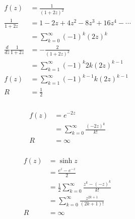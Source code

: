 \documentclass{article}
\begin{document}
\setcounter{subsubsection}{2}
\subsubsection{}

\begin{align*}
  f(z)                            & = \frac{1}{(1 + 2 z)^2}                            \\
  \frac{1}{1 + 2 z}               & = 1 - 2 z + 4 z^2 - 8 z^3 + 16 z^4 - \cdots        \\
                                  & = \sum_{k = 0}^\infty (-1)^k (2 z)^k               \\
  \frac{d}{d z} \frac{1}{1 + 2 z} & = -\frac{2}{(1 + 2 z)^2}                           \\
                                  & = \sum_{k = 1}^\infty (-1)^k 2 k (2 z)^{k - 1}     \\
  f(z)                            & = \sum_{k = 1}^\infty (-1)^{k - 1} k (2 z)^{k - 1} \\
  R                               & = \frac{1}{2}
\end{align*}

\setcounter{subsubsection}{4}
\subsubsection{}

\begin{align*}
  f(z) & = e^{-2 z}                                \\
       & = \sum_{k = 0}^\infty \frac{(-2 z)^k}{k!} \\
  R    & = \infty
\end{align*}

\setcounter{subsubsection}{6}
\subsubsection{}

\begin{align*}
  f(z) & = \sinh z                                                 \\
       & = \frac{e^z - e^{-z}}{2}                                  \\
       & = \frac{1}{2} \sum_{k = 0}^\infty \frac{z^k - (-z)^k}{k!} \\
       & = \sum_{k = 0}^\infty \frac{z^{2 k + 1}}{(2 k + 1)!}      \\
  R    & = \infty
\end{align*}
\end{document}
